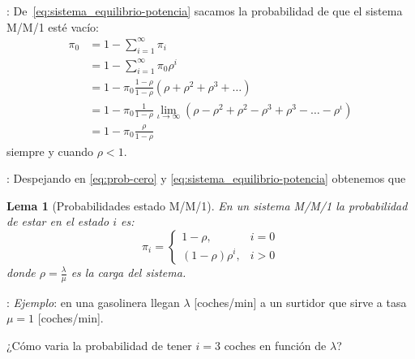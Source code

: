\documentclass[xcolor={x11names}]{beamer}
\newtheorem{lema}{Lema}[section]
\begin{document}
\begin{frame}{\secname: \subsecname}
    De~\eqref{eq:sistema_equilibrio-potencia}
    sacamos la
    probabilidad de que el sistema
    M/M/1 esté vacío:
    \begin{align}
        \pi_0 &= 1 - \sum_{i=1}^\infty \pi_i\label{eq:prob-cero}\\
              &= 1 - \sum_{i=1}^\infty \pi_0\rho^i\nonumber\\
              &= 1 - \pi_0\frac{1-\rho}{1-\rho}
        \left(\rho+\rho^2+\rho^3+\ldots  \right)\nonumber\\
        &= 1 - \pi_0\frac{1}{1-\rho}
        \lim_{\iota\to\infty}\left( \rho - \rho^2 + \rho^2 - \rho^3 + \rho^3 - \ldots - \rho^\iota \right)\nonumber\\
        &= 1 - \pi_0 \frac{\rho}{1-\rho}\nonumber
    \end{align}
    siempre y cuando $\rho<1$.
\end{frame}





\begin{frame}{\secname: \subsecname}
    Despejando en \eqref{eq:prob-cero}
    y \eqref{eq:sistema_equilibrio-potencia}
    obtenemos que

    \begin{lema}[Probabilidades estado M/M/1]
        En un sistema M/M/1 la probabilidad
        de estar en el estado $i$ es:
        \begin{equation}
            \pi_i =
            \begin{cases}
                1-\rho, & i=0\\
                (1-\rho)\rho^i, & i>0
            \end{cases}
        \end{equation}
        donde $\rho=\tfrac{\lambda}{\mu}$
        es la carga del sistema.
    \end{lema}
\end{frame}




\begin{frame}{\secname: \subsecname}
    \textit{Ejemplo}: en una gasolinera llegan
    $\lambda$ [coches/min] a un surtidor
    que sirve a tasa $\mu=1$ [coches/min].

    ¿Cómo varia la probabilidad
    de tener $i=3$ coches en función de
    $\lambda$?

    \vfill

    \begin{figure}
        
    \end{figure}
\end{frame}
\end{document}

